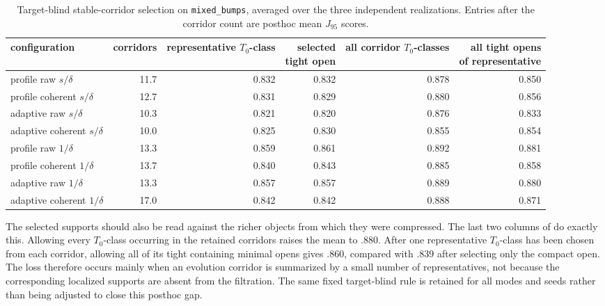 \documentclass[a4paper,11pt]{article}
\theoremstyle{definition}
\theoremstyle{remark}
\begin{document}
\begin{table}[!ht]
\centering
\small
\caption{Target-blind stable-corridor selection on \texttt{mixed\_bumps}, averaged over the three independent realizations. Entries after the corridor count are posthoc mean $J_{95}$ scores.}
\label{tab:mixed-bumps-t0-selection}
\setlength{\tabcolsep}{3.2pt}
\begin{tabular}{@{}lrrrrr@{}}
\toprule
configuration & corridors & \shortstack{representative\\$T_0$-class} & \shortstack{selected\\tight open} & \shortstack{all corridor\\$T_0$-classes} & \shortstack{all tight opens\\of representative} \\
\midrule
profile raw $s/\delta$ & 11.7 & 0.832 & 0.832 & 0.878 & 0.850 \\
profile coherent $s/\delta$ & 12.7 & 0.831 & 0.829 & 0.880 & 0.856 \\
adaptive raw $s/\delta$ & 10.3 & 0.821 & 0.820 & 0.876 & 0.833 \\
adaptive coherent $s/\delta$ & 10.0 & 0.825 & 0.830 & 0.855 & 0.854 \\
profile raw $1/\delta$ & 13.3 & 0.859 & 0.861 & 0.892 & 0.881 \\
profile coherent $1/\delta$ & 13.7 & 0.840 & 0.843 & 0.885 & 0.858 \\
adaptive raw $1/\delta$ & 13.3 & 0.857 & 0.857 & 0.889 & 0.880 \\
adaptive coherent $1/\delta$ & 17.0 & 0.842 & 0.842 & 0.888 & 0.871 \\
\bottomrule
\end{tabular}
\end{table}

The selected supports should also be read against the richer objects from which they were compressed. The last two columns of  do exactly this.  Allowing every $T_0$-class occurring in the retained corridors raises the mean to $.880$. After one representative $T_0$-class has been chosen from each corridor, allowing all of its tight containing minimal opens gives $.860$, compared with $.839$ after selecting only the compact open. The loss therefore occurs mainly when an evolution corridor is summarized by a small number of representatives, not because the corresponding localized supports are absent from the filtration. The same fixed target-blind rule is retained for all modes and seeds rather than being adjusted to close this posthoc gap.
\end{document}
